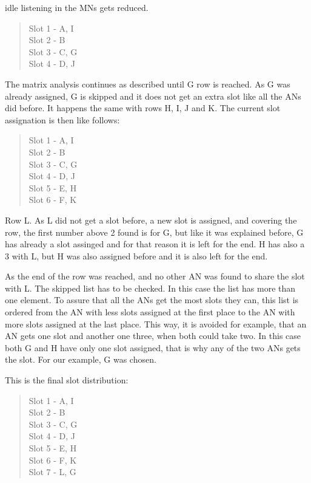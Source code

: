 \begin{itemize}
idle listening in the \acp{MN} gets reduced.
 \begin{quote}
  Slot 1 - A, I \\ Slot 2 - B \\ Slot 3 - C, G \\ Slot 4 - D, J
 \end{quote}
The matrix analysis continues as described until G row is reached. As G was already assigned, G is skipped and it does not get an extra 
slot like all the \acp{AN} did before. It happens the same with rows H, I, J and K. The current slot assignation is then like follows:
 \begin{quote}
  Slot 1 - A, I \\ Slot 2 - B \\ Slot 3 - C, G \\ Slot 4 - D, J \\ Slot 5 - E, H \\ Slot 6 - F, K
 \end{quote}
Row L. As L did not get a slot before, a new slot is assigned, and covering the row, the first number above 2 found is for G, but
like it was explained before, G has already a slot assinged and for that reason it is left for the end. H has also a 3 with L, but H 
was also assigned before and it is also left for the end.

As the end of the row was reached, and no other \ac{AN} was found to share the slot with L. The skipped list has to be checked. In this case 
the list has more than one element. To assure that all the \acp{AN} get the most slots they can, this list is ordered from the \ac{AN} with 
less slots assigned at the first place to the \ac{AN} with more slots assigned at the last place. This way, it is avoided for example, that 
an \ac{AN} gets one slot and another one three, when both could take two. In this case both G and H have only one slot assigned, that is why any 
of the two \acp{AN} gets the slot. For our example, G was chosen.

This is the final slot distribution:
 \begin{quote}
  Slot 1 - A, I \\ Slot 2 - B \\ Slot 3 - C, G \\ Slot 4 - D, J \\ Slot 5 - E, H \\ Slot 6 - F, K \\ Slot 7 - L, G
 \end{quote}
\end{itemize}

